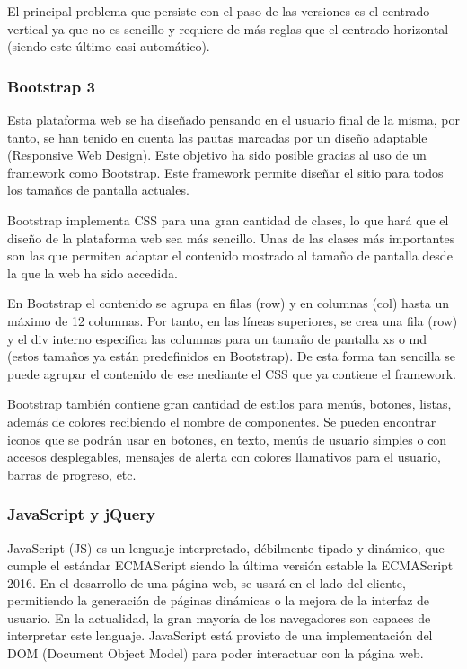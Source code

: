 El principal problema que persiste con el paso de las versiones es el centrado vertical ya que no es sencillo y requiere de más reglas que el centrado horizontal (siendo este último casi automático).

\subsubsection{Bootstrap 3}

Esta plataforma web se ha diseñado pensando en el usuario final de la misma, por tanto, se han tenido en cuenta las pautas marcadas por un diseño adaptable (Responsive Web Design). Este objetivo ha sido posible gracias al uso de un framework como Bootstrap. Este framework permite diseñar el sitio para todos los tamaños de pantalla actuales.

Bootstrap \cite{boot:info} implementa CSS para una gran cantidad de clases, lo que hará que el diseño de la plataforma web sea más sencillo. Unas de las clases más importantes son las que permiten adaptar el contenido mostrado al tamaño de pantalla desde la que la web ha sido accedida.

En Bootstrap el contenido se agrupa en filas (row) y en columnas (col) hasta un máximo de 12 columnas. Por tanto, en las líneas superiores, se crea una fila (row) y el div interno especifica las columnas para un tamaño de pantalla xs o md (estos tamaños ya están predefinidos en Bootstrap). De esta forma tan sencilla se puede agrupar el contenido de ese  mediante el CSS que ya contiene el framework. 

Bootstrap también contiene gran cantidad de estilos para menús, botones, listas, además de colores recibiendo el nombre de componentes. Se pueden encontrar iconos que se podrán usar en botones, en texto, menús de usuario simples o con accesos desplegables, mensajes de alerta con colores llamativos para el usuario, barras de progreso, etc.

\subsubsection{JavaScript y jQuery}

JavaScript (JS) es un lenguaje interpretado, débilmente tipado y dinámico, que cumple el estándar ECMAScript siendo la última versión estable la ECMAScript 2016. En el desarrollo de una página web, se usará en el lado del cliente, permitiendo la generación de páginas dinámicas o la mejora de la interfaz de usuario. En la actualidad, la gran mayoría de los navegadores son capaces de interpretar este lenguaje. JavaScript está provisto de una implementación del DOM (Document Object Model) para poder interactuar con la página web.

